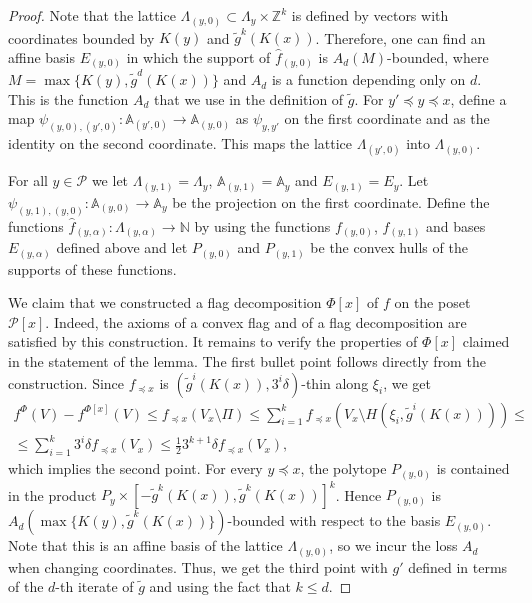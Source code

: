 \documentclass{daj}
\renewcommand{\le}{\leqslant}
\newcommand{\Z}{\mathbb Z}
\newcommand{\A}{\mathbb A}
\newcommand{\N}{\mathbb N}
\renewcommand{\P}{\mathcal P}
\theoremstyle{definition}
\theoremstyle{remark}
\theoremstyle{definition}
\theoremstyle{definition}
\begin{document}
\begin{proof}
Note that the lattice $\Lambda_{(y, 0)} \subset \Lambda_y \times \Z^k$ is defined by vectors with coordinates bounded by $K(y)$ and $\tilde g^k(K(x))$. Therefore, one can find an affine basis $E_{(y, 0)}$ in which the support of $\hat f_{(y, 0)}$ is $A_d(M)$-bounded, where $M=\max\{K(y), \tilde g^d(K(x))\}$ and $A_d$ is a function depending only on $d$. This is the function $A_d$ that we use in the definition of $\tilde g$. 
For $y' \preceq y \preceq x$, define a map $\psi_{(y, 0), (y',0)}: \A_{(y', 0)} \rightarrow \A_{(y, 0)}$ as $\psi_{y,y'}$ on the first coordinate and as the identity on the second coordinate. This maps the lattice $\Lambda_{(y', 0)}$ into $\Lambda_{(y, 0)}$.

For all $y\in \P$ we let $\Lambda_{(y, 1)} = \Lambda_y$, $\A_{(y, 1)} = \A_y$ and $E_{(y, 1)} = E_y$. Let $\psi_{(y, 1), (y, 0)}: \A_{(y, 0)} \rightarrow \A_{y}$ be the projection on the first coordinate.
Define the functions $\hat f_{(y, \alpha)}: \Lambda_{(y, \alpha)} \rightarrow \N$ by using the functions $f_{(y, 0)}$, $f_{(y, 1)}$ and bases $E_{(y, \alpha)}$ defined above and let $P_{(y,0)}$ and $P_{(y, 1)}$ be the convex hulls of the supports of these functions.

We claim that we constructed a flag decomposition $\Phi[x]$ of $f$ on the poset $\P[x]$. Indeed, the axioms of a convex flag and of a flag decomposition are satisfied by this construction. It remains to verify the properties of $\Phi[x]$ claimed in the statement of the lemma. The first bullet point follows directly from the construction. Since $f_{\preceq x}$ is $(\tilde g^{i}(K(x)), 3^i \delta)$-thin along $\xi_i$, we get
\begin{align*}
f^{\Phi}(V)- f^{\Phi[x]}(V) \le f_{\preceq x}(V_x \setminus \Pi) \le \sum_{i=1}^k f_{\preceq x}(V_x \setminus H(\xi_i, \tilde g^i(K(x)))) \le \\
\le \sum_{i=1}^k 3^i \delta f_{\preceq x}(V_x) \le \frac12 3^{k+1}\delta f_{\preceq x}(V_x),
\end{align*}
which implies the second point. For every $y \preceq x$, the polytope $P_{(y, 0)}$ is contained in the product $P_y \times [-\tilde g^k(K(x)), \tilde g^k(K(x))]^k$. Hence $P_{(y, 0)}$ is $A_d(\max \{K(y), \tilde g^k(K(x))\})$-bounded with respect to the basis $E_{(y, 0)}$. Note that this is an affine basis of the lattice $\Lambda_{(y,0)}$, so we incur the loss $A_d$ when changing coordinates. Thus, we get the third point with $g'$ defined in terms of the $d$-th iterate of $\tilde g$ and using the fact that $k\le d$.   


\end{proof}
\end{document}
